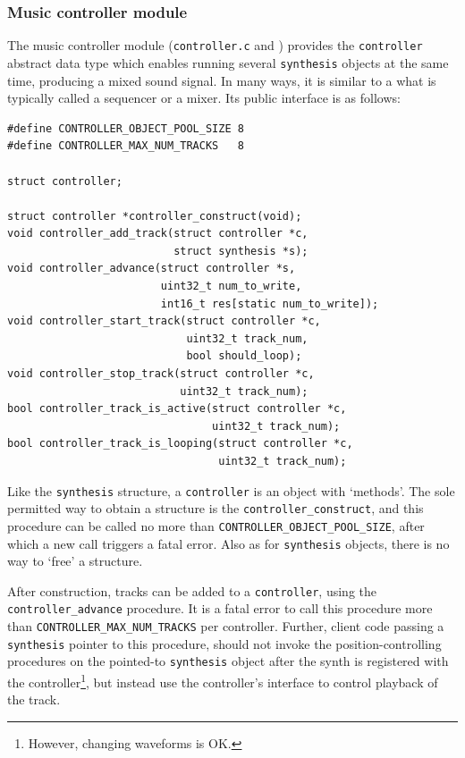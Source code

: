 \documentclass[a4paper,9pt]{article}
\newcommand{\isrc}[1]{\texttt{#1}}
\begin{document}
\subsubsection{Music controller module}
The music controller module (\texttt{controller.c} and ) provides the
\isrc{controller} abstract data type which enables running several
\isrc{synthesis} objects at the same time, producing
a mixed sound signal. In many ways, it is similar to a what is
typically called a sequencer or a mixer.  Its public interface is as follows:
\begin{lstlisting}
#define CONTROLLER_OBJECT_POOL_SIZE 8
#define CONTROLLER_MAX_NUM_TRACKS   8

struct controller;

struct controller *controller_construct(void);
void controller_add_track(struct controller *c, 
                          struct synthesis *s);
void controller_advance(struct controller *s, 
                        uint32_t num_to_write, 
                        int16_t res[static num_to_write]);
void controller_start_track(struct controller *c, 
                            uint32_t track_num,
                            bool should_loop);
void controller_stop_track(struct controller *c, 
                           uint32_t track_num);
bool controller_track_is_active(struct controller *c,
                                uint32_t track_num);
bool controller_track_is_looping(struct controller *c,
                                 uint32_t track_num);
\end{lstlisting}
Like the \isrc{synthesis} structure, a \isrc{controller} is an object with
`methods'.  The sole permitted way to obtain a structure is the
\isrc{controller\_construct}, and this procedure can be called no more than
\isrc{CONTROLLER\_OBJECT\_POOL\_SIZE}, after which a new call triggers a fatal
error. Also as for \isrc{synthesis} objects, there is no way to `free' a
structure.

After construction, tracks can be added to a \isrc{controller}, using the
\isrc{controller\_advance} procedure. It is a fatal error to call this
procedure more than \isrc{CONTROLLER\_MAX\_NUM\_TRACKS} per controller.
Further, client code passing a \isrc{synthesis} pointer to this procedure,
should not invoke the position-controlling procedures on the pointed-to
\isrc{synthesis} object after the synth is registered with the
controller\footnote{However, changing waveforms is OK.}, but instead use the
controller's interface to control playback of the track.
\end{document}
